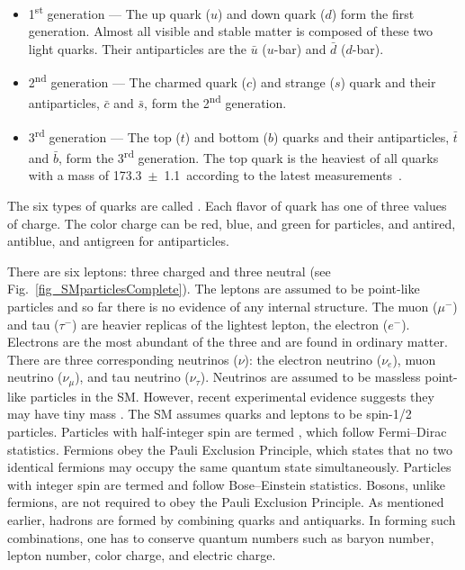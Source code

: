 \vspace{-0.015\textheight}
\begin{singlespace}
\begin{itemize}
\item {1\textsuperscript{st} generation --- The up quark ($u$) and down quark ($d$) form the first generation. Almost all visible and stable matter is composed of these two light quarks. Their antiparticles are the $\bar{u}$ ($u$-bar) and $\bar{d}$ ($d$-bar).}
\item {2\textsuperscript{nd} generation --- The charmed quark ($c$) and strange ($s$) quark and their antiparticles, $\bar{c}$ and $\bar{s}$, form the 2\textsuperscript{nd} generation.}
\item {3\textsuperscript{rd} generation --- The top ($t$) and bottom ($b$) quarks and their antiparticles, $\bar{t}$ and $\bar{b}$, form the 3\textsuperscript{rd} generation. The top quark is the heaviest of all quarks with a mass of 173.3~$\pm$~1.1~\massunits according to the latest measurements~\cite{pap:TopMass}.}
\end{itemize}
 \end{singlespace}

The six types of quarks are called . Each flavor of quark has one of three values of  charge. The color charge can be red, blue, and green for particles, and antired, antiblue, and antigreen for antiparticles.

There are six leptons: three charged and three neutral (see Fig.~\ref{fig_SMparticlesComplete}). The leptons are assumed to be point-like particles and so far there is no evidence of any internal structure. The muon ($\mu^{-}$) and tau ($\tau^{-}$) are heavier replicas of the lightest lepton, the electron ($e^{-}$). Electrons are the most abundant of the three and are found in ordinary matter. There are three corresponding neutrinos ($\nu$): the electron neutrino ($\nu_{e}$), muon neutrino ($\nu_{\mu}$), and tau neutrino ($\nu_{\tau}$). Neutrinos are assumed to be massless point-like particles in the SM. However, recent experimental evidence suggests they may have tiny mass \cite{pap:PDG}. The SM assumes quarks and leptons to be spin-1/2 particles. Particles with half-integer spin are termed , which follow Fermi--Dirac statistics. Fermions obey the Pauli Exclusion Principle, which states that no two identical fermions may occupy the same quantum state simultaneously. Particles with integer spin are termed  and follow Bose--Einstein statistics. Bosons, unlike fermions, are not required to obey the Pauli Exclusion Principle. As mentioned earlier, hadrons are formed by combining quarks and antiquarks. In forming such combinations, one has to conserve quantum numbers such as baryon number, lepton number, color charge, and electric charge.

